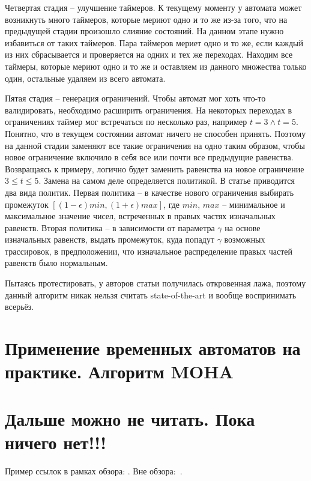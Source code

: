 \documentclass[times,specification,annotation]{itmo-student-thesis}
\begin{document}
Четвертая стадия -- улучшение таймеров. К текущему моменту у автомата может возникнуть много таймеров, которые мериют одно и то же из-за того, что на предыдущей стадии произошло слияние состояний.
На данном этапе нужно избавиться от таких таймеров. Пара таймеров мериет одно и то же, если каждый из них сбрасывается и проверяется на одних и тех же переходах. Находим все таймеры, которые мериют
одно и то же и оставляем из данного множества только один, остальные удаляем из всего автомата.

Пятая стадия -- генерация ограничений. Чтобы автомат мог хоть что-то валидировать, необходимо расширить ограничения. На некоторых переходах в ограничениях таймер мог встречаться по несколько раз, 
например $t = 3 \land t = 5$. Понятно, что в текущем состоянии автомат ничего не способен принять. Поэтому на данной стадии заменяют все такие ограничения на одно таким образом, чтобы новое ограничение
включило в себя все или почти все предыдущие равенства. Возвращаясь к примеру, логично будет заменить равенства на новое ограничение $3 \leq t \leq 5$. Замена на самом деле определяется политикой.
В статье приводится два вида политик. Первая политика -- в качестве нового ограничения выбирать промежуток $[(1-\epsilon)min, (1+\epsilon)max]$, где $min$, $max$ -- минимальное
и максимальное значение чисел, встреченных в правых частях изначальных равенств. Вторая политика -- в зависимости от параметра $\gamma$
на основе изначальных равенств, выдать промежуток, куда попадут $\gamma$ возможных трассировок, в предположении, что изначальное распределение правых частей равенств было нормальным.

Пытаясь протестировать, у авторов статьи получилась откровенная лажа, поэтому данный алгоритм никак нельзя считать state-of-the-art и вообще воспринимать всерьёз.

\section{Применение временных автоматов на практике. Алгоритм MOHA}

\section{Дальше можно не читать. Пока ничего нет!!!}

\startrelatedwork
Пример ссылок в рамках обзора: \cite{example-english, example-russian, unrestricted-jump-evco, doerr-doerr-lambda-lambda-self-adjustment-arxiv}.
\finishrelatedwork
Вне обзора:~\cite{bellman}.
\end{document}
